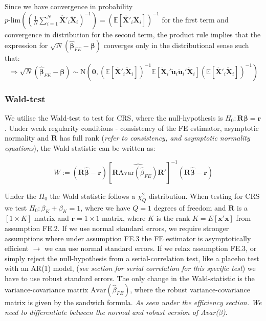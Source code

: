 Since we have convergence in probability $p\text{-lim}\left( \left(\frac{1}{N} \sum_{i=1}^N {\pmb{\ddot{X'}}_{i} \pmb{\ddot{X}}_{i} } \right)^{-1}\right)=(\mathbb{E}[\pmb{\ddot{X'}}_{i} \pmb{\ddot{X}}_{i}])^{-1}$ for the first term and convergence in distribution for the second term, the product rule implies that the expression for $\sqrt{N}(\pmb{\hat{\beta}}_{FE}-\pmb{\beta})$ converges only in the distributional sense such that:
$$\Rightarrow \sqrt{N}(\pmb{\hat{\beta}}_{FE}-\pmb{\beta}) \sim \text{N} \left(\pmb{0},
(\mathbb{E}[\pmb{\ddot{X'}}_{i} \pmb{\ddot{X}}_{i}])^{-1} \mathbb{E}[\pmb{\ddot{X}}_i' \pmb{\ddot{u}}_i\pmb{\ddot{u}}_i'\pmb{\ddot{X}}_i] (\mathbb{E}[\pmb{\ddot{X'}}_{i} \pmb{\ddot{X}}_{i}])^{-1} \right)$$



\subsubsection*{Wald-test}
We utilise the Wald-test to test for CRS, where the null-hypothesis is $H_0: \mathbf{R}\boldsymbol{\beta}=\mathbf{r}$. Under weak regularity conditions - consistency of the FE estimator, asymptotic normality and $\mathbf{R}$ has full rank (\textit{refer to  consistency, and asymptotic normality equations}), the Wald statistic can be written as:


\begin{equation*}
    W:=(\mathbf{R}\widehat{\boldsymbol{\beta}}-\mathbf{r})[\mathbf{R}\widehat{\text{Avar}(\widehat{\beta}_{FE})}\mathbf{R}']^{-1}(\mathbf{R} \boldsymbol{\widehat{\beta}}-\mathbf{r})
\end{equation*}

Under the $H_0$ the Wald statistic follows a $\chi^2_Q$ distribution. When testing for CRS we test $H_0:\beta_K+\beta_K=1$, where we have $Q=1$ degrees of freedom and  $\mathbf{R}$ is a $[1 \times K]$ matrix and $\textbf{r}=1 \times 1$ matrix, where $K$ is the rank $K=E[\textbf{x}'\textbf{x}]$  from assumption FE.2. If we use normal standard errors, we require stronger assumptions where under assumption FE.3 the FE estimator is asymptotically efficient $\rightarrow$ we can use normal standard errors. If we relax assumption FE.3, or simply reject the null-hypothesis from a serial-correlation test, like a placebo test with an AR(1) model, (\textit{see section for serial correlation for this specific test}) we have to use robust standard errors. The only change in the Wald-statistic is the variance-covariance matrix $\text{Avar}(\hat{\beta}_{FE})$, where the robust variance-covariance matrix is given by the sandwich formula. \newline
\textit{As seen under the efficiency section. We need to differentiate between the normal and robust version of Avar($\beta$)}.

